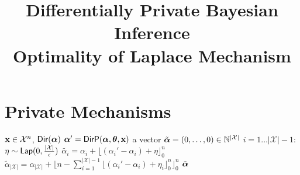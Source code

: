 \documentclass{article}
\begin{document}
\title{ Differentially Private Bayesian Inference \\
 Optimality of Laplace Mechanism}

\author{} %

\maketitle

\section{Private Mechanisms}

%
%
%
\begin{algorithm}
  \caption{$\lapmech$}
  \label{lapmech}
  \begin{algorithmic}
  \STATE $\textbf{x}\in\mathcal{X}^n$, $\mathsf{Dir}(\boldsymbol{\alpha})$
  \STATE {} $\boldsymbol{\alpha}' = \mathsf{DirP}(\boldsymbol{\alpha},\boldsymbol{\theta},\textbf{x})$
  \STATE {} a vector $\tilde{\boldsymbol{\alpha}} = (0, \dots, 0 )\in \mathbb{N}^{|\mathcal{X}|}$ 
  \STATE {} $i = 1 \dots |\mathcal{X}| - 1$:
  \STATE \quad {} $\eta \sim \mathsf{Lap}(0, \frac{|\mathcal{X}|}{\epsilon})$
  \STATE \quad \quad  $\tilde{\alpha_i}=\alpha_i + \lfloor{(\alpha_i' - \alpha_i) + \eta}\rfloor^n_0$ 
  \STATE \quad $\tilde{\alpha}_{|\mathcal{X}|} = \alpha_{|\mathcal{X}|} + \lfloor n - \sum_{i = 1}^{|\mathcal{X}|-1}\lfloor{(\alpha_i' - \alpha_i) + \eta_i}\rfloor^n_0 \rfloor^n_0$
   $\tilde{\boldsymbol{\alpha}}$
  \end{algorithmic}
\end{algorithm}
%
%
%
%
%
\end{document}
